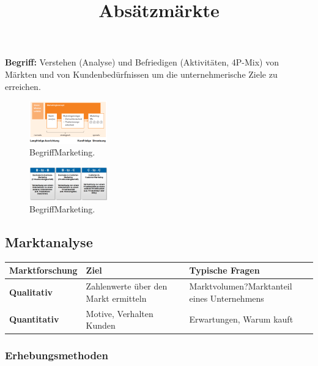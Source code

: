 \documentclass[../ZF_Wing.tex]{subfiles}
\begin{document}
\textbf{Begriff: } Verstehen (Analyse) und Befriedigen (Aktivitäten, 4P-Mix) von Märkten und von Kundenbedürfnissen um die unternehmerische Ziele zu erreichen. \\

\begin{figure}[H]
\centering
\includegraphics[width=0.3\textwidth]{Resources/Image/BegriffMarketing.png}
\caption{\label{fig:BegriffMarketing}BegriffMarketing.}
\end{figure}

\title{Absätzmärkte}

\begin{figure}[H]
\centering
\includegraphics[width=0.3\textwidth]{Resources/Image/Absatzmarkt.png}
\caption{\label{fig:BegriffMarketing}BegriffMarketing.}
\end{figure}


\subsection{Marktanalyse}


														


\begin{tabular}{|l|l|l|}
\hline 
\textbf{Marktforschung} & \textbf{ Ziel} & {Typische Fragen} \\ 
\hline
\rule[-1ex]{0pt}{2.5ex}  
\textbf{Qualitativ} & Zahlenwerte über den Markt ermitteln & Marktvolumen?Marktanteil eines Unternehmens\\ 
\hline 
\textbf{Quantitativ} & Motive, Verhalten Kunden & Erwartungen, Warum kauft  \\ 
\hline 
\end{tabular} 

\subsubsection{Erhebungsmethoden}
\end{document}
